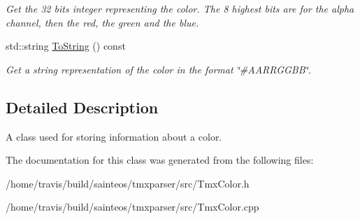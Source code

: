 \begin{DoxyCompactItemize}
\begin{DoxyCompactList}\small\item\em Get the 32 bits integer representing the color. The 8 highest bits are for the alpha channel, then the red, the green and the blue. \end{DoxyCompactList}\item 
\hypertarget{classTmx_1_1Color_af20cd78adf89d3c3e81ee126e3a8be73}{std\-::string \hyperlink{classTmx_1_1Color_af20cd78adf89d3c3e81ee126e3a8be73}{To\-String} () const }\label{classTmx_1_1Color_af20cd78adf89d3c3e81ee126e3a8be73}

\begin{DoxyCompactList}\small\item\em Get a string representation of the color in the format \char`\"{}\#\-A\-A\-R\-R\-G\-G\-B\-B\char`\"{}. \end{DoxyCompactList}\end{DoxyCompactItemize}


\subsection{Detailed Description}
A class used for storing information about a color. 

The documentation for this class was generated from the following files\-:\begin{DoxyCompactItemize}
\item 
/home/travis/build/sainteos/tmxparser/src/Tmx\-Color.\-h\item 
/home/travis/build/sainteos/tmxparser/src/Tmx\-Color.\-cpp\end{DoxyCompactItemize}
